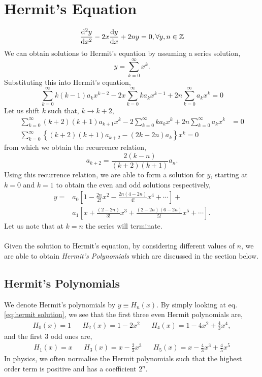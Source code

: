 \documentclass{book}
\begin{document}
\section{Hermit's Equation}
\begin{equation}
	\dv[2]{y}{x} - 2x\dv{y}{x} + 2ny = 0, \forall y, n \in \mathbb{Z}
\end{equation}
We can obtain solutions to Hermit's equation by assuming a series solution,
\begin{equation}
	y = \sum_{k=0}^{\infty}x^k.
\end{equation}
Substituting this into Hermit's equation,
\begin{equation}
	\sum_{k=0}^{\infty}k(k-1)a_kx^{k-2} - 2x\sum_{k=0}^{\infty}ka_kx^{k-1} + 2n\sum_{k=0}^{\infty}a_kx^k = 0
\end{equation}
Let us shift $k$ such that, $k \to k + 2$,
\begin{equation}
	\begin{split}
		\sum_{k=0}^{\infty}(k+2)(k+1)a_{k+1}x^k - 2\sum_{k=0}^{\infty}ka_kx^k + 2n\sum_{k=0}^{\infty}a_kx^k & = 0 \\
		\sum_{k=0}^{\infty}\left\{(k+2)(k+1)a_{k+2} - (2k-2n)a_{k}\right\}x^k = 0
	\end{split}
\end{equation}
from which we obtain the recurrence relation,
\begin{equation}
	a_{k+2} = \frac{2(k-n)}{(k+2)(k+1)}a_n.
\end{equation}
Using this recurrence relation, we are able to form a solution for $y$, starting at $k=0$ and $k=1$ to obtain the even and odd solutions respectively,
\begin{equation}
	\begin{split}
		y = & a_0\left[1 - \frac{2n}{2!}x^2 - \frac{2n(4-2n)}{4!}x^4 + \cdots\right] + \\
		& a_1\left[x + \frac{(2-2n)}{3!}x^3 + \frac{(2-2n)(6-2n)}{5!}x^5 + \cdots\right]. \label{eq:hermit solution} 
	\end{split}
\end{equation}
Let us note that at $k=n$ the series will terminate.
\\\\
Given the solution to Hermit's equation, by considering different values of $n$, we are able to obtain \textit{Hermit's Polynomials} which are discussed in the section below.
\subsection{Hermit's Polynomials}
We denote Hermit's polynomials by $y \equiv H_n(x)$. By simply looking at eq. \eqref{eq:hermit solution}, we see that the first three even Hermit polynomials are,
\begin{align}
	H_0(x) = 1 && H_2(x) = 1 - 2x^2 && H_4(x) = 1 - 4x^2 + \frac{4}{3}x^4,
\end{align}
and the first 3 odd ones are,
\begin{align}
	H_1(x) = x && H_3(x) = x - \frac{2}{3}x^3 && H_5(x) = x - \frac{4}{3}x^3 + \frac{4}{5}x^5
\end{align}
In physics, we often normalise the Hermit polynomials such that the highest order term is positive and has a coefficient $2^n$.
\end{document}
